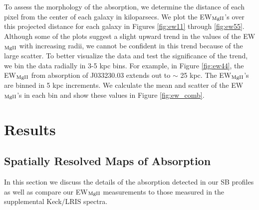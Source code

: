 \documentclass[twocolumn]{aastex61}
\begin{document}
To assess the morphology of the  absorption, we determine the distance of each pixel from the center of each galaxy in kiloparsecs. We plot the EW$_{\rm{MgII}}$'s over this projected distance for each galaxy in Figures \ref{fig:ew11} through \ref{fig:ew55}. Although some of the plots suggest a slight upward trend in the values of the EW$_{\rm{MgII}}$ with increasing radii, we cannot be confident in this trend because of the large scatter. To better visualize the data and test the significance of the trend, we bin the data radially in 3-5 kpc bins. For example, in Figure \ref{fig:ew44}, the EW$_{\rm{MgII}}$ from absorption of J033230.03 extends out to $\sim$ 25 kpc. The EW$_{\rm{MgII}}$'s are binned in 5 kpc increments. We calculate the mean and scatter of the EW$_{\rm{MgII}}$'s in each bin and show these values in Figure \ref{fig:ew_comb}.   

\section{Results}\label{sec:results}

\subsection{Spatially Resolved Maps of  Absorption}
In this section we discuss the details of the absorption detected in our SB profiles as well as compare our EW$_{\rm{MgII}}$ measurements to those measured in the supplemental Keck/LRIS spectra. 
\end{document}
